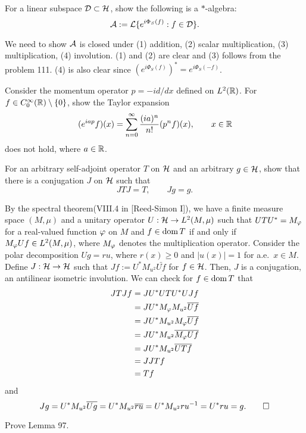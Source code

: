 \documentclass{../../../small}
\begin{document}
\begin{prb}
For a linear subspace $\cD\subset\cH$, show the following is a $*$-algebra:
\[\cA:=\cL\{e^{i\Phi_S(f)}:f\in\cD\}.\]
\end{prb}
\begin{sol}
We need to show $\cA$ is closed under (1) addition, (2) scalar multiplication, (3) multiplication, (4) involution.
(1) and (2) are clear and (3) follows from the problem 111.
(4) is also clear since $(e^{i\Phi_S(f)})^*=e^{i\Phi_S(-f)}$.
\end{sol}

\begin{prb}
Consider the momentum operator $p=-id/dx$ defined on $L^2(\R)$.
For $f\in C_0^\infty(\R)\setminus\{0\}$, show the Taylor expansion
\[(e^{iap}f)(x)=\sum_{n=0}^\infty\frac{(ia)^n}{n!}(p^nf)(x),\qquad x\in\R\]
does not hold, where $a\in\R$.
\end{prb}
\begin{sol}
\end{sol}

\begin{prb}
For an arbitrary self-adjoint operator $T$ on $\cH$ and an arbitrary $g\in\cH$, show that there is a conjugation $J$ on $\cH$ such that
\[JTJ=T,\qquad Jg=g.\]
\end{prb}
\begin{sol}
By the spectral theorem(VIII.4 in [Reed-Simon I]), we have a finite measure space $(M,\mu)$ and a unitary operator $U:\cH\to L^2(M,\mu)$ such that $UTU^*=M_\f$ for a real-valued function $\f$ on $M$ and $f\in\dom T$ if and only if $M_\f Uf\in L^2(M,\mu)$, where $M_\f$ denotes the multiplication operator.
Consider the polar decomposition $Ug=ru$, where $r(x)\ge0$ and $|u(x)|=1$ for a.e.~$x\in M$.
Define $J:\cH\to\cH$ such that $Jf:=U^*M_{u^2}\bar{Uf}$ for $f\in\cH$.
Then, $J$ is a conjugation, an antilinear isometric involution.
We can check for $f\in\dom T$ that
\begin{align*}
JTJf
&=JU^*UTU^*UJf\\
&=JU^*M_\f M_{u^2}\bar{Uf}\\
&=JU^*M_{u^2}M_\f\bar{Uf}\\
&=JU^*M_{u^2}\bar{M_\f Uf}\\
&=JU^*M_{u^2}\bar{UTf}\\
&=JJTf\\
&=Tf
\end{align*}
and
\[Jg=U^*M_{u^2}\bar{Ug}=U^*M_{u^2}\bar{ru}=U^*M_{u^2}ru^{-1}=U^*ru=g.\qedhere\]
\end{sol}

\begin{prb}
Prove Lemma 97.
\end{prb}
\begin{sol}
\end{sol}
\end{document}
